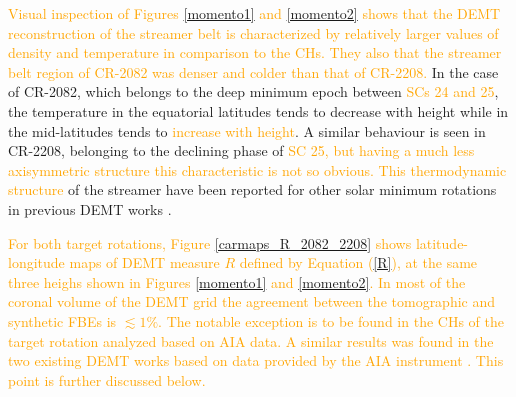 \documentclass[namedreferences]{solarphysics}
\def\albert#1{\textcolor{orange}{#1}}
\begin{document}
\begin{article}
\albert{Visual inspection of Figures \ref{momento1} and \ref{momento2} shows that the DEMT reconstruction of the streamer belt is characterized by relatively larger values of density and temperature in comparison to the CHs. They also that the streamer belt region of CR-2082 was denser and colder than  that of CR-2208.} In the case of CR-2082, which belongs to the deep minimum epoch between \albert{SCs 24 and 25}, the temperature in the equatorial latitudes tends to decrease with height while in the mid-latitudes tends to \albert{increase with height}. A similar behaviour is seen in CR-2208, belonging to the declining phase of \albert{SC 25, but having a much less axisymmetric structure this characteristic is not so obvious. This thermodynamic structure} of the streamer have been reported for other solar minimum rotations in previous DEMT works \citep{lloveras_2017,nuevo_2013,vasquez_2010}.

\albert{For both target rotations, Figure \ref{carmaps_R_2082_2208} shows {latitude-longitude} maps of DEMT measure $R$ defined by Equation (\ref{R}), at the same three heighs shown in Figures \ref{momento1} and \ref{momento2}. In most of the coronal volume of the DEMT grid the agreement between the tomographic and synthetic FBEs is $\lesssim 1\%$. The notable exception is to be found in the CHs of the target rotation analyzed based on AIA data. A similar results was found in the two existing DEMT works based on data provided by the AIA instrument \citep{nuevo_2015,maccormack_2017}. This point is further discussed below.}


\end{article}
\end{document}

